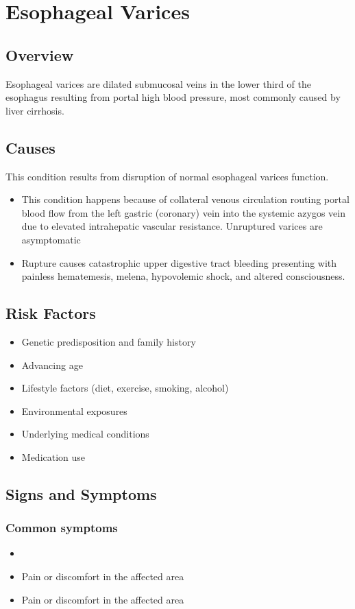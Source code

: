 \chapter{Esophageal Varices}
\label{sec:Esophageal Varices}

\section{Overview}
Esophageal varices are dilated submucosal veins in the lower third of the esophagus resulting from portal high blood pressure, most commonly caused by liver cirrhosis.
\section{Causes}
This condition results from disruption of normal esophageal varices function.

\begin{itemize}[noitemsep]
  \item This condition happens because of collateral venous circulation routing portal blood flow from the left gastric (coronary) vein into the systemic azygos vein due to elevated intrahepatic vascular resistance. Unruptured varices are asymptomatic
  \item Rupture causes catastrophic upper digestive tract bleeding presenting with painless hematemesis, melena, hypovolemic shock, and altered consciousness.
\end{itemize}
\section{Risk Factors}


\begin{itemize}[noitemsep]
  \item Genetic predisposition and family history
  \item Advancing age
  \item Lifestyle factors (diet, exercise, smoking, alcohol)
  \item Environmental exposures
  \item Underlying medical conditions
  \item Medication use
\end{itemize}
\section{Signs and Symptoms}

\subsection{Common symptoms}
\begin{itemize}[noitemsep]
  \item \item Pain or discomfort in the affected area    \item Pain or discomfort in the affected area
  \end{itemize}

